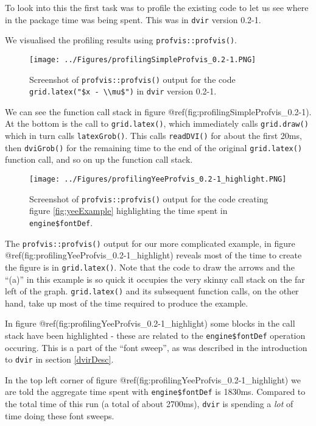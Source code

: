 \documentclass[]{article}
\begin{document}
To look into this the first task was to profile the existing code to let
us see where in the package time was being spent. This was in
\texttt{dvir} version 0.2-1.

We visualised the profiling results using \texttt{profvis::profvis()}.

\begin{figure}
\centering
\texttt{[image: ../Figures/profilingSimpleProfvis\_0.2-1.PNG]}
\caption{Screenshot of \texttt{profvis::profvis()} output for the code
\texttt{grid.latex("\$x\ -\ \textbackslash{}\textbackslash{}mu\$")} in
\texttt{dvir} version 0.2-1.}
\end{figure}

We can see the function call stack in figure
@ref(fig:profilingSimpleProfvis\_0.2-1). At the bottom is the call to
\texttt{grid.latex()}, which immediately calls \texttt{grid.draw()}
which in turn calls \texttt{latexGrob()}. This calls \texttt{readDVI()}
for about the first 20ms, then \texttt{dviGrob()} for the remaining time
to the end of the original \texttt{grid.latex()} function call, and so
on up the function call stack.

\begin{figure}
\centering
\texttt{[image: ../Figures/profilingYeeProfvis\_0.2-1\_highlight.PNG]}
\caption{Screenshot of \texttt{profvis::profvis()} output for the code
creating figure \ref{fig:yeeExample} highlighting the time spent in
\texttt{engine\$fontDef}.}
\end{figure}

The \texttt{profvis::profvis()} output for our more complicated example,
in figure @ref(fig:profilingYeeProfvis\_0.2-1\_highlight) reveals most
of the time to create the figure is in \texttt{grid.latex()}. Note that
the code to draw the arrows and the ``(a)'' in this example is so quick
it occupies the very skinny call stack on the far left of the graph.
\texttt{grid.latex()} and its subsequent function calls, on the other
hand, take up most of the time required to produce the example.

In figure @ref(fig:profilingYeeProfvis\_0.2-1\_highlight) some blocks in
the call stack have been highlighted - these are related to the
\texttt{engine\$fontDef} operation occuring. This is a part of the
``font sweep'', as was described in the introduction to \texttt{dvir} in
section \ref{dvirDesc}.

In the top left corner of figure
@ref(fig:profilingYeeProfvis\_0.2-1\_highlight) we are told the
aggregate time spent with \texttt{engine\$fontDef} is 1830ms. Compared
to the total time of this run (a total of about 2700ms), \texttt{dvir}
is spending a \emph{lot} of time doing these font sweeps.
\end{document}
